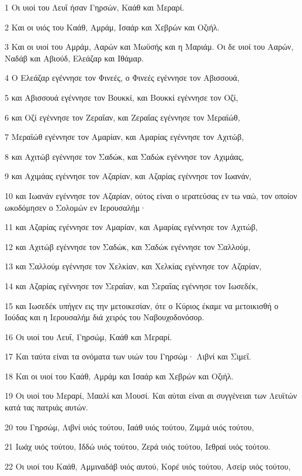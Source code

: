 \par 1 Οι υιοί του Λευΐ ήσαν Γηρσών, Καάθ και Μεραρί.
\par 2 Και οι υιός του Καάθ, Αμράμ, Ισαάρ και Χεβρών και Οζιήλ.
\par 3 Και οι υιοί του Αμράμ, Ααρών και Μωϋσής και η Μαριάμ. Οι δε υιοί του Ααρών, Ναδάβ και Αβιούδ, Ελεάζαρ και Ιθάμαρ.
\par 4 Ο Ελεάζαρ εγέννησε τον Φινεές, ο Φινεές εγέννησε τον Αβισσουά,
\par 5 και Αβισσουά εγέννησε τον Βουκκί, και Βουκκί εγέννησε τον Οζί,
\par 6 και Οζί εγέννησε τον Ζεραΐαν, και Ζεραΐας εγέννησε τον Μεραϊώθ,
\par 7 Μεραϊώθ εγέννησε τον Αμαρίαν, και Αμαρίας εγέννησε τον Αχιτώβ,
\par 8 και Αχιτώβ εγέννησε τον Σαδώκ, και Σαδώκ εγέννησε τον Αχιμάας,
\par 9 και Αχιμάας εγέννησε τον Αζαρίαν, και Αζαρίας εγέννησε τον Ιωανάν,
\par 10 και Ιωανάν εγέννησε τον Αζαρίαν, ούτος είναι ο ιερατεύσας εν τω ναώ, τον οποίον ωκοδόμησεν ο Σολομών εν Ιερουσαλήμ·
\par 11 και Αζαρίας εγέννησε τον Αμαρίαν, και Αμαρίας εγέννησε τον Αχιτώβ,
\par 12 και Αχιτώβ εγέννησε τον Σαδώκ, και Σαδώκ εγέννησε τον Σαλλούμ,
\par 13 και Σαλλούμ εγέννησε τον Χελκίαν, και Χελκίας εγέννησε τον Αζαρίαν,
\par 14 και Αζαρίας εγέννησε τον Σεραΐαν, και Σεραΐας εγέννησε τον Ιωσεδέκ,
\par 15 και Ιωσεδέκ υπήγεν εις την μετοικεσίαν, ότε ο Κύριος έκαμε να μετοικισθή ο Ιούδας και η Ιερουσαλήμ διά χειρός του Ναβουχοδονόσορ.
\par 16 Οι υιοί του Λευΐ, Γηρσώμ, Καάθ και Μεραρί.
\par 17 Και ταύτα είναι τα ονόματα των υιών του Γηρσώμ· Λιβνί και Σιμεΐ.
\par 18 Και οι υιοί του Καάθ, Αμράμ και Ισαάρ και Χεβρών και Οζιήλ.
\par 19 Οι υιοί του Μεραρί, Μααλί και Μουσί. Και αύται είναι αι συγγένειαι των Λευϊτών κατά τας πατριάς αυτών.
\par 20 του Γηρσώμ, Λιβνί υιός τούτου, Ιαάθ υιός τούτου, Ζιμμά υιός τούτου,
\par 21 Ιωάχ υιός τούτου, Ιδδώ υιός τούτου, Ζερά υιός τούτου, Ιεθραί υιός τούτου.
\par 22 Οι υιοί του Καάθ, Αμμιναδάβ υιός αυτού, Κορέ υιός τούτου, Ασείρ υιός τούτου,

